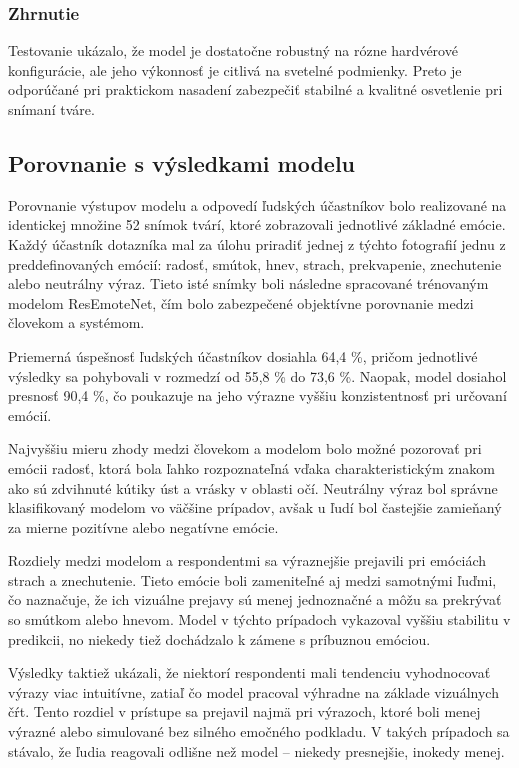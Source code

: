 \subsubsection{Zhrnutie}
Testovanie uk\'azalo, \v{z}e model je dostato\v{c}ne robustn\'y na r\'ozne hardv\'erov\'e konfigur\'acie, ale jeho v\'ykonnos\v{t} je citliv\'a na sveteln\'e podmienky. Preto je odpor\'u\v{c}an\'e pri praktickom nasaden\'i zabezpe\v{c}i\v{t} stabiln\'e a kvalitn\'e osvetlenie pri sn\'iman\'i tv\'are.

\subsection{Porovnanie s výsledkami modelu}

Porovnanie výstupov modelu a odpovedí ľudských účastníkov bolo realizované na identickej množine 52 snímok tvárí, ktoré zobrazovali jednotlivé základné emócie. Každý účastník dotazníka mal za úlohu priradiť jednej z týchto fotografií jednu z preddefinovaných emócií: radosť, smútok, hnev, strach, prekvapenie, znechutenie alebo neutrálny výraz. Tieto isté snímky boli následne spracované trénovaným modelom ResEmoteNet, čím bolo zabezpečené objektívne porovnanie medzi človekom a systémom.

Priemerná úspešnosť ľudských účastníkov dosiahla 64,4 \%, pričom jednotlivé výsledky sa pohybovali v rozmedzí od 55,8 \% do 73,6 \%. Naopak, model dosiahol presnosť 90,4 \%, čo poukazuje na jeho výrazne vyššiu konzistentnosť pri určovaní emócií.

Najvyššiu mieru zhody medzi človekom a modelom bolo možné pozorovať pri emócii radosť, ktorá bola ľahko rozpoznateľná vďaka charakteristickým znakom ako sú zdvihnuté kútiky úst a vrásky v oblasti očí. Neutrálny výraz bol správne klasifikovaný modelom vo väčšine prípadov, avšak u ľudí bol častejšie zamieňaný za mierne pozitívne alebo negatívne emócie.

Rozdiely medzi modelom a respondentmi sa výraznejšie prejavili pri emóciách strach a znechutenie. Tieto emócie boli zameniteľné aj medzi samotnými ľuďmi, čo naznačuje, že ich vizuálne prejavy sú menej jednoznačné a môžu sa prekrývať so smútkom alebo hnevom. Model v týchto prípadoch vykazoval vyššiu stabilitu v predikcii, no niekedy tiež dochádzalo k zámene s príbuznou emóciou.

Výsledky taktiež ukázali, že niektorí respondenti mali tendenciu vyhodnocovať výrazy viac intuitívne, zatiaľ čo model pracoval výhradne na základe vizuálnych čŕt. Tento rozdiel v prístupe sa prejavil najmä pri výrazoch, ktoré boli menej výrazné alebo simulované bez silného emočného podkladu. V takých prípadoch sa stávalo, že ľudia reagovali odlišne než model – niekedy presnejšie, inokedy menej.

